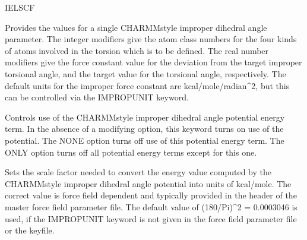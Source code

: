 \documentclass[letterpaper,11pt,english]{sphinxmanual}
\begin{document}
\ignorespaces {}\label{\detokenize{text/keywords:key-iel-scf}}
\sphinxAtStartPar
IEL\sphinxhyphen{}SCF

\ignorespaces {}\label{\detokenize{text/keywords:key-improper}}\begin{description}
\sphinxAtStartPar
Provides the values for a single CHARMM\sphinxhyphen{}style improper dihedral angle parameter. The integer modifiers give the atom class numbers for the four kinds of atoms involved in the torsion which is to be defined. The real number modifiers give the force constant value for the deviation from the target improper torsional angle, and the target value for the torsional angle, respectively. The default units for the improper force constant are kcal/mole/radian\textasciicircum{}2, but this can be controlled via the IMPROPUNIT keyword.

\end{description}

\ignorespaces {}\label{\detokenize{text/keywords:key-impropterm}}\begin{description}
\sphinxAtStartPar
Controls use of the CHARMM\sphinxhyphen{}style improper dihedral angle potential energy term. In the absence of a modifying option, this keyword turns on use of the potential. The NONE option turns off use of this potential energy term. The ONLY option turns off all potential energy terms except for this one.

\end{description}

\ignorespaces {}\label{\detokenize{text/keywords:key-impropunit}}\begin{description}
\sphinxAtStartPar
Sets the scale factor needed to convert the energy value computed by the CHARMM\sphinxhyphen{}style improper dihedral angle potential into units of kcal/mole. The correct value is force field dependent and typically provided in the header of the master force field parameter file. The default value of (180/Pi)\textasciicircum{}2 = 0.0003046 is used, if the IMPROPUNIT keyword is not given in the force field parameter file or the keyfile.

\end{description}
\end{document}
